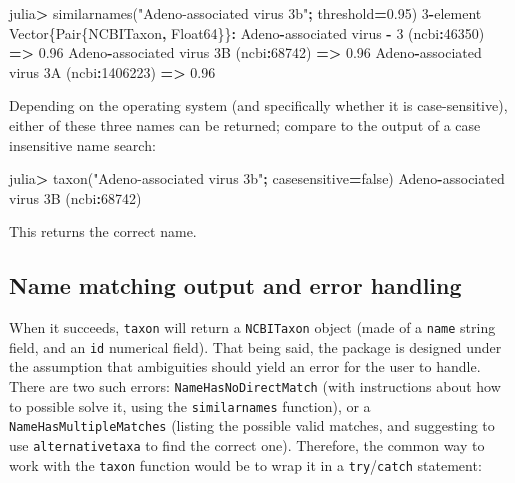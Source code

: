 \documentclass[10pt,oneside]{article}
\newenvironment{Shaded}{\begin{snugshade}}{\end{snugshade}}
\newcommand{\DataTypeTok}[1]{\textcolor[rgb]{0.13,0.29,0.53}{#1}}
\newcommand{\FloatTok}[1]{\textcolor[rgb]{0.00,0.00,0.81}{#1}}
\newcommand{\StringTok}[1]{\textcolor[rgb]{0.31,0.60,0.02}{#1}}
\newcommand{\OperatorTok}[1]{\textcolor[rgb]{0.81,0.36,0.00}{\textbf{#1}}}
\newcommand{\ExtensionTok}[1]{#1}
\newcommand{\NormalTok}[1]{#1}
\begin{document}
\begin{Shaded}
\begin{Highlighting}[]
\NormalTok{julia}\OperatorTok{\textgreater{}}\NormalTok{ similarnames(}\StringTok{"Adeno{-}associated virus 3b"}\OperatorTok{;}\NormalTok{ threshold}\OperatorTok{=}\FloatTok{0.95}\NormalTok{)}
\FloatTok{3}\OperatorTok{{-}}\NormalTok{element }\DataTypeTok{Vector}\NormalTok{\{}\DataTypeTok{Pair}\NormalTok{\{NCBITaxon}\OperatorTok{,} \DataTypeTok{Float64}\NormalTok{\}\}}\OperatorTok{:}
\NormalTok{  Adeno}\OperatorTok{{-}}\NormalTok{associated virus }\OperatorTok{{-}} \FloatTok{3}\NormalTok{ (ncbi}\OperatorTok{:}\FloatTok{46350}\NormalTok{) }\OperatorTok{=\textgreater{}} \FloatTok{0.96}
\NormalTok{   Adeno}\OperatorTok{{-}}\NormalTok{associated virus }\FloatTok{3}\NormalTok{B (ncbi}\OperatorTok{:}\FloatTok{68742}\NormalTok{) }\OperatorTok{=\textgreater{}} \FloatTok{0.96}
\NormalTok{ Adeno}\OperatorTok{{-}}\NormalTok{associated virus }\FloatTok{3}\NormalTok{A (ncbi}\OperatorTok{:}\FloatTok{1406223}\NormalTok{) }\OperatorTok{=\textgreater{}} \FloatTok{0.96}
\end{Highlighting}
\end{Shaded}

Depending on the operating system (and specifically whether it is
case-sensitive), either of these three names can be returned; compare to
the output of a case insensitive name search:

\begin{Shaded}
\begin{Highlighting}[]
\NormalTok{julia}\OperatorTok{\textgreater{}}\NormalTok{ taxon(}\StringTok{"Adeno{-}associated virus 3b"}\OperatorTok{;}\NormalTok{ casesensitive}\OperatorTok{=}\ExtensionTok{false}\NormalTok{)}
\NormalTok{Adeno}\OperatorTok{{-}}\NormalTok{associated virus }\FloatTok{3}\NormalTok{B (ncbi}\OperatorTok{:}\FloatTok{68742}\NormalTok{)}
\end{Highlighting}
\end{Shaded}

This returns the correct name.

\hypertarget{name-matching-output-and-error-handling}{%
\subsection{Name matching output and error
handling}\label{name-matching-output-and-error-handling}}

When it succeeds, \texttt{taxon} will return a \texttt{NCBITaxon} object
(made of a \texttt{name} string field, and an \texttt{id} numerical
field). That being said, the package is designed under the assumption
that ambiguities should yield an error for the user to handle. There are
two such errors: \texttt{NameHasNoDirectMatch} (with instructions about
how to possible solve it, using the \texttt{similarnames} function), or
a \texttt{NameHasMultipleMatches} (listing the possible valid matches,
and suggesting to use \texttt{alternativetaxa} to find the correct one).
Therefore, the common way to work with the \texttt{taxon} function would
be to wrap it in a \texttt{try}/\texttt{catch} statement:
\end{document}
